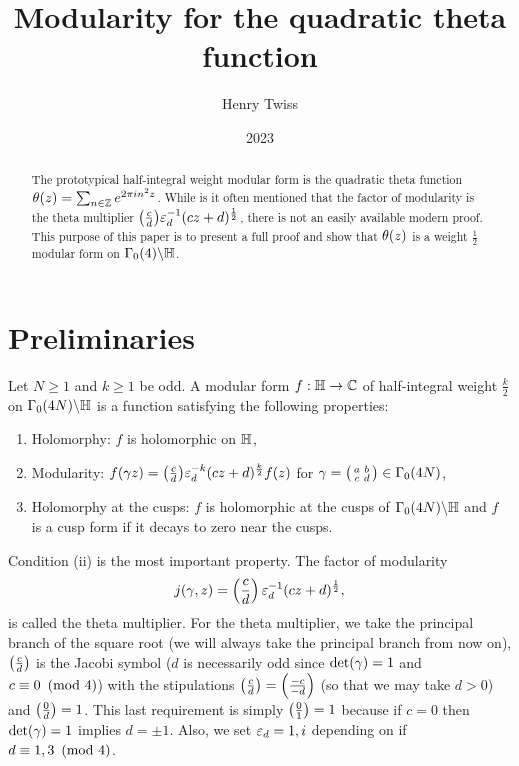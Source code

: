 \documentclass[12pt,reqno,oneside]{amsart}
\title{Modularity for the quadratic theta function}
\author{Henry Twiss}
\date{2023}
\begin{document}
\begin{abstract}
    The prototypical half-integral weight modular form is the quadratic theta function $\theta(z) = \sum_{n \in \mathbb{Z}}e^{2\pi in^{2}z}$. While is it often mentioned that the factor of modularity is the theta multiplier $\textstyle{\left(\frac{c}{d}\right)}\varepsilon_{d}^{-1}(cz+d)^{\frac{1}{2}}$, there is not an easily available modern proof. This purpose of this paper is to present a full proof and show that $\theta(z)$ is a weight $\frac{1}{2}$ modular form on $\Gamma_{0}(4)\backslash\mathbb{H}$.
\end{abstract}

\maketitle

\section{Preliminaries}
    Let $N \ge 1$ and $k \ge 1$ be odd. A modular form $f:\mathbb{H} \to \mathbb{C}$ of half-integral weight $\frac{k}{2}$ on $\Gamma_{0}(4N)\backslash\mathbb{H}$ is a function satisfying the following properties:
    \begin{enumerate}[label=(\roman*)]
        \item Holomorphy: $f$ is holomorphic on $\mathbb{H}$,
        \item Modularity: $f(\gamma z) = \textstyle{\left(\frac{c}{d}\right)}\varepsilon_{d}^{-k}(cz+d)^{\frac{k}{2}}f(z)$ for $\gamma = \begin{psmallmatrix} a & b \\ c & d \end{psmallmatrix} \in \Gamma_{0}(4N)$,
        \item Holomorphy at the cusps: $f$ is holomorphic at the cusps of $\Gamma_{0}(4N)\backslash\mathbb{H}$ and $f$ is a cusp form if it decays to zero near the cusps.
    \end{enumerate}
    Condition (ii) is the most important property. The factor of modularity
    \[
        j(\gamma,z) = \left(\frac{c}{d}\right)\varepsilon_{d}^{-1}(cz+d)^{\frac{1}{2}},
    \]
    is called the theta multiplier. For the theta multiplier, we take the principal branch of the square root (we will always take the principal branch from now on), $\left(\frac{c}{d}\right)$ is the Jacobi symbol ($d$ is necessarily odd since $\det(\gamma) = 1$ and $c \equiv 0 \ \left(\text{mod }4\right)$) with the stipulations $\left(\frac{c}{d}\right) = \left(\frac{-c}{-d}\right)$ (so that we may take $d > 0$) and $\left(\frac{0}{d}\right) = 1$. This last requirement is simply $\left(\frac{0}{1}\right) = 1$ because if $c = 0$ then $\det(\gamma) = 1$ implies $d = \pm 1$. Also, we set $\varepsilon_{d} = 1,i$ depending on if $d \equiv 1,3 \ \left(\text{mod }4\right)$.
    
\end{document}
